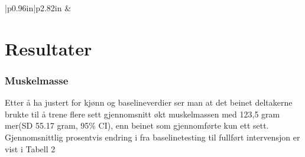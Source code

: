 \documentclass[
]{book}
\begin{document}
\begin{longtable}[c]{|p{0.96in}|p{2.82in}}
 &  \\

\noalign{\global\setlength{\arrayrulewidth}{2pt}}



\end{longtable}

\hypertarget{resultater-2}{%
\section{Resultater}\label{resultater-2}}

\hypertarget{muskelmasse}{%
\subsubsection{Muskelmasse}\label{muskelmasse}}

Etter å ha justert for kjønn og baselineverdier ser man at det beinet deltakerne brukte til å trene flere sett gjennomsnitt økt muskelmassen med 123,5 gram mer(SD 55.17 gram, 95\% CI), enn beinet som gjennomførte kun ett sett. Gjennomsnittlig prosentvis endring i fra baselinetesting til fullført intervensjon er vist i Tabell 2

\providecommand{\docline}[3]{\noalign{\global\setlength{\arrayrulewidth}{#1}}\arrayrulecolor[HTML]{#2}\cline{#3}}

\setlength{\tabcolsep}{2pt}

\renewcommand*{\arraystretch}{1.5}
\end{document}
